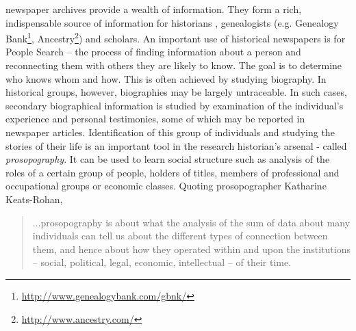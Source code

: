 \documentclass[10pt,journal,compsoc]{IEEEtran}
\begin{document}
% 
% 
% 
% 
 newspaper archives provide a wealth of information. They form a rich, indispensable source of information for historians \cite{allen2010historians}, genealogists (e.g. Genealogy Bank\footnote{\url{http://www.genealogybank.com/gbnk/}}, Ancestry\footnote{\url{http://www.ancestry.com/}}) and scholars.
An important use of historical newspapers is for People Search\cite{BilenkoMCRF03,Friedman_92} -- the process of finding information about a person and reconnecting them with others they are likely to know. The goal is to determine who knows whom and how. This is often achieved by studying biography. In historical groups, however, biographies may be largely untraceable. In such cases, secondary biographical information is studied by examination of the individual's experience and personal testimonies, some of which may be reported in newspaper articles. Identification of this group of individuals and studying the stories of their life is an important tool in the research historian's arsenal - called \textit{prosopography}. 
It can be used to learn social structure such as analysis of the roles of a certain group of people, holders of titles, members of professional and occupational groups or economic classes.
Quoting prosopographer Katharine Keats-Rohan, 
\begin{quote}
...prosopography is about what the analysis of the sum of data about many individuals can tell us about the different types of connection between them, and hence about how they operated within and upon the institutions -- social, political, legal, economic, intellectual -- of their time.
\end{quote}
\end{document}
